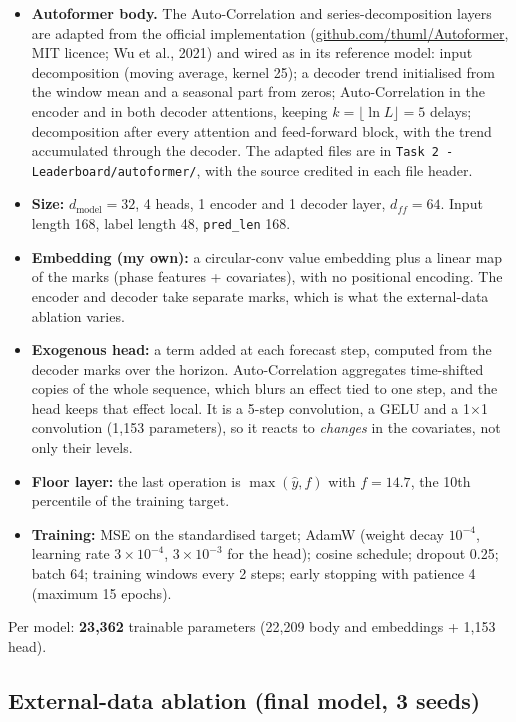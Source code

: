 \documentclass[11pt,a4paper]{article}
\begin{document}
\begin{itemize}
  \item \textbf{Autoformer body.} The Auto-Correlation and series-decomposition layers are adapted from the official implementation (\href{https://github.com/thuml/Autoformer}{github.com/thuml/Autoformer}, MIT licence; Wu et al., 2021) and wired as in its reference model: input decomposition (moving average, kernel 25); a decoder trend initialised from the window mean and a seasonal part from zeros; Auto-Correlation in the encoder and in both decoder attentions, keeping $k=\lfloor \ln L\rfloor = 5$ delays; decomposition after every attention and feed-forward block, with the trend accumulated through the decoder. The adapted files are in \texttt{Task 2 - Leaderboard/autoformer/}, with the source credited in each file header.
  \item \textbf{Size:} $d_{\text{model}}=32$, 4 heads, 1 encoder and 1 decoder layer, $d_{ff}=64$. Input length 168, label length 48, \texttt{pred\_len} 168.
  \item \textbf{Embedding (my own):} a circular-conv value embedding plus a linear map of the marks (phase features + covariates), with no positional encoding. The encoder and decoder take separate marks, which is what the external-data ablation varies.
  \item \textbf{Exogenous head:} a term added at each forecast step, computed from the decoder marks over the horizon. Auto-Correlation aggregates time-shifted copies of the whole sequence, which blurs an effect tied to one step, and the head keeps that effect local. It is a 5-step convolution, a GELU and a 1$\times$1 convolution (1{,}153 parameters), so it reacts to \emph{changes} in the covariates, not only their levels.
  \item \textbf{Floor layer:} the last operation is $\max(\hat y, f)$ with $f=14.7$, the 10th percentile of the training target.
  \item \textbf{Training:} MSE on the standardised target; AdamW (weight decay $10^{-4}$, learning rate $3\times10^{-4}$, $3\times10^{-3}$ for the head); cosine schedule; dropout 0.25; batch 64; training windows every 2 steps; early stopping with patience 4 (maximum 15 epochs).
\end{itemize}
Per model: \textbf{23{,}362} trainable parameters (22{,}209 body and embeddings + 1{,}153 head).

\subsection*{External-data ablation (final model, 3 seeds)}
\end{document}
